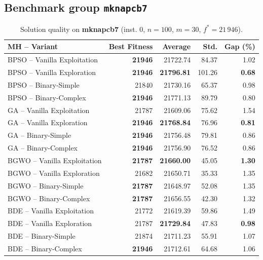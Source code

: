 \documentclass[journal,article,submit,moreauthors]{Definitions/mdpi}
\begin{document}
\clearpage
\subsection{Benchmark group \texttt{mknapcb7}}

\begin{table}[htbp]
  \centering
  \small
  \caption{Solution quality on \textbf{mknapcb7} (inst. 0, $n=100$, $m=30$, $f^*=21\,946$).}
  \label{tab:calidad_mknapcb7_0}
  \begin{tabular}{lrrrr}
    \toprule
    \textbf{MH -- Variant} &
    \textbf{Best Fitness} &
    \textbf{Average} &
    \textbf{Std.} &
    \textbf{Gap (\%)} \\
    \midrule
    BPSO -- Vanilla Exploitation & \textbf{21946} &         21722.74 &  84.37 &         1.02 \\
    BPSO -- Vanilla Exploration  & \textbf{21946} & \textbf{21796.81} & 101.26 & \textbf{0.68} \\
    BPSO -- Binary-Simple        &          21840 &         21730.16 &  65.37 &         0.98 \\
    BPSO -- Binary-Complex       & \textbf{21946} &         21771.13 &  89.79 &         0.80 \\
    \midrule
    GA -- Vanilla Exploitation   &          21787 &         21609.06 &  75.62 &         1.54 \\
    GA -- Vanilla Exploration    & \textbf{21946} & \textbf{21768.84} &  76.96 & \textbf{0.81} \\
    GA -- Binary-Simple          & \textbf{21946} &         21756.48 &  79.81 &         0.86 \\
    GA -- Binary-Complex         & \textbf{21946} &         21756.90 &  76.52 &         0.86 \\
    \midrule
    BGWO -- Vanilla Exploitation & \textbf{21787} & \textbf{21660.00} &  45.05 & \textbf{1.30} \\
    BGWO -- Vanilla Exploration  &          21682 &         21650.71 &  35.33 &         1.35 \\
    BGWO -- Binary-Simple        & \textbf{21787} &         21648.97 &  52.08 &         1.35 \\
    BGWO -- Binary-Complex       & \textbf{21787} &         21656.55 &  42.30 &         1.32 \\
    \midrule
    BDE -- Vanilla Exploitation  &          21772 &         21619.39 &  59.86 &         1.49 \\
    BDE -- Vanilla Exploration   &          21787 & \textbf{21729.84} &  47.83 & \textbf{0.98} \\
    BDE -- Binary-Simple         &          21874 &         21711.23 &  55.91 &         1.07 \\
    BDE -- Binary-Complex        & \textbf{21946} &         21712.61 &  64.68 &         1.06 \\
    \bottomrule
  \end{tabular}
\end{table}
\end{document}
